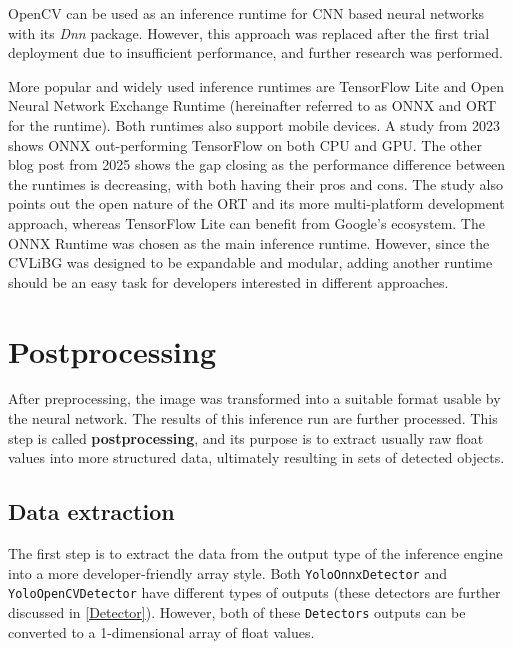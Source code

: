 OpenCV can be used as an inference runtime for CNN based neural networks with its \textit{Dnn} package. However, this approach was replaced after the first trial deployment due to insufficient performance, and further research was performed. 

More popular and widely used inference runtimes are TensorFlow Lite and Open Neural Network Exchange Runtime (hereinafter referred to as ONNX and ORT for the runtime). Both runtimes also support mobile devices. A study from 2023 \cite{Ren2023_ONNX_TensorFlow_BScan} shows ONNX out-performing TensorFlow on both CPU and GPU. The other blog post \cite{aimtechnoOnnxTFcomparison} from 2025 shows the gap closing as the performance difference between the runtimes is decreasing, with both having their pros and cons. The study also points out the open nature of the ORT and its more multi-platform development approach, whereas TensorFlow Lite can benefit from Google's ecosystem. The ONNX Runtime was chosen as the main inference runtime. However, since the CVLiBG was designed to be expandable and modular, adding another runtime should be an easy task for developers interested in different approaches.




\section{Postprocessing}
After preprocessing, the image was transformed into a suitable format usable by the neural network. The results of this inference run are further processed. This step is called \textbf{postprocessing}, and its purpose is to extract usually raw float values into more structured data, ultimately resulting in sets of detected objects. 

\subsection{Data extraction}
The first step is to extract the data from the output type of the inference engine into a more developer-friendly array style. Both \texttt{YoloOnnxDetector} and \texttt{YoloOpenCVDetector} have different types of outputs (these detectors are further discussed in \ref{Detector}). However, both of these \texttt{Detectors} outputs can be converted to a 1-dimensional array of float values.

